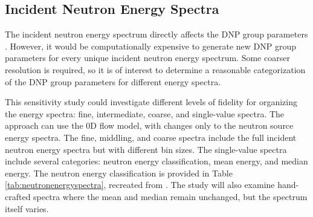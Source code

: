 \subsection{Incident Neutron Energy Spectra}
\label{sec:indidentspectra}
The incident neutron energy spectrum directly affects the \gls{DNP} group parameters \cite{brady1989delayed}.
However, it would be computationally expensive to generate new \gls{DNP} group parameters for every unique incident neutron energy spectrum.
Some coarser resolution is required, so it is of interest to determine a reasonable categorization of the \gls{DNP} group parameters for different energy spectra.

This sensitivity study could investigate different levels of fidelity for organizing the energy spectra: fine, intermediate, coarse, and single-value spectra.
The approach can use the 0D flow model, with changes only to the neutron source energy spectra.
The fine, middling, and coarse spectra include the full incident neutron energy spectra but with different bin sizes.
The single-value spectra include several categories: neutron energy classification, mean energy, and median energy.
The neutron energy classification is provided in Table \ref{tab:neutronenergyspectra}, recreated from \cite{l2003nuclear}.
The study will also examine hand-crafted spectra where the mean and median remain unchanged, but the spectrum itself varies.

